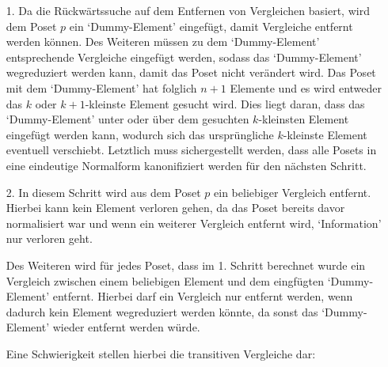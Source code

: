 \documentclass[10pt,journal,compsoc]{IEEEtran}
\begin{document}
\begin{itemize}
  \item[1.]
        Da die Rückwärtssuche auf dem Entfernen von Vergleichen basiert, wird dem Poset $p$ ein `Dummy-Element' eingefügt, damit Vergleiche entfernt werden können.
        Des Weiteren müssen zu dem `Dummy-Element' entsprechende Vergleiche eingefügt werden, sodass das `Dummy-Element' wegreduziert werden kann, damit das Poset nicht verändert wird.
        Das Poset mit dem `Dummy-Element' hat folglich $n + 1$ Elemente und es wird entweder das $k$ oder $k + 1$-kleinste Element gesucht wird.
        Dies liegt daran, dass das `Dummy-Element' unter oder über dem gesuchten $k$-kleinsten Element eingefügt werden kann, wodurch sich das ursprüngliche $k$-kleinste Element eventuell verschiebt.
        Letztlich muss sichergestellt werden, dass alle Posets in eine eindeutige Normalform kanonifiziert werden für den nächsten Schritt.

  \item[2.]
        In diesem Schritt wird aus dem Poset $p$ ein beliebiger Vergleich entfernt.
        Hierbei kann kein Element verloren gehen, da das Poset bereits davor normalisiert war und wenn ein weiterer Vergleich entfernt wird, `Information' nur verloren geht. %

        Des Weiteren wird für jedes Poset, dass im 1. Schritt berechnet wurde ein Vergleich zwischen einem beliebigen Element und dem eingfügten `Dummy-Element' entfernt.
        Hierbei darf ein Vergleich nur entfernt werden, wenn dadurch kein Element wegreduziert werden könnte, da sonst das `Dummy-Element' wieder entfernt werden würde.

        Eine Schwierigkeit stellen hierbei die transitiven Vergleiche dar: \\
        \begin{figure}
\end{figure}
\end{itemize}
\end{document}
